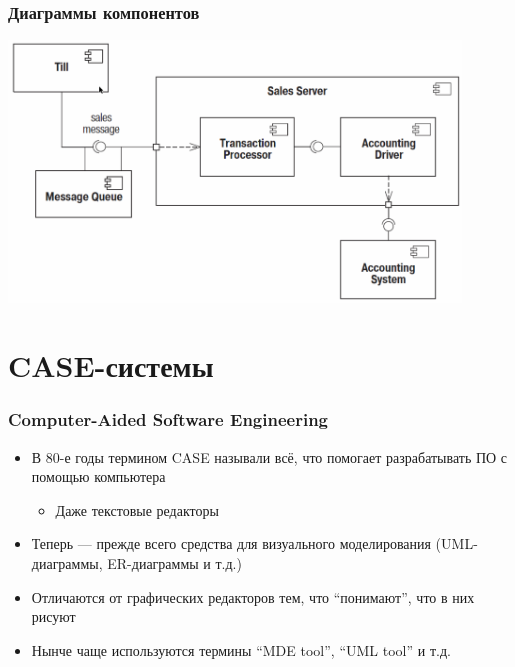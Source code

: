 \documentclass[xetex,mathserif,serif]{beamer}
\begin{document}
	\begin{frame}
		\frametitle{Диаграммы компонентов}
		\begin{center}
			\includegraphics[width=0.9\textwidth]{componentDiagram.png}
		\end{center}
	\end{frame}

	\section{CASE-системы}

	\begin{frame}
		\frametitle{Computer-Aided Software Engineering}
		\begin{itemize}
			\item В 80-е годы термином CASE называли всё, что помогает разрабатывать ПО с помощью компьютера
			\begin{itemize}
				\item Даже текстовые редакторы
			\end{itemize}
			\item Теперь --- прежде всего средства для визуального моделирования (UML-диаграммы, ER-диаграммы и т.д.)
			\item Отличаются от графических редакторов тем, что ``понимают'', что в них рисуют
			\item Нынче чаще используются термины ``MDE tool'', ``UML tool'' и т.д.
		\end{itemize}
	\end{frame}
\end{document}
